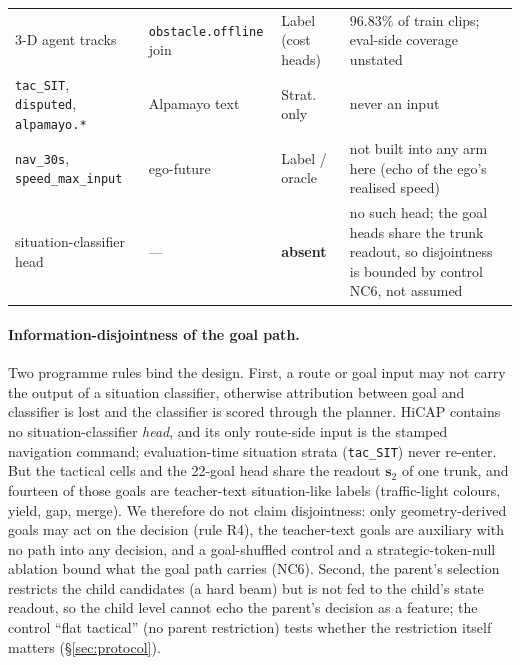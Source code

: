 \begin{table}[t]
\begin{tabular}{@{}p{4.6cm}p{2.5cm}p{2.7cm}p{5.0cm}@{}}
3-D agent tracks & \texttt{obstacle.offline} join & Label (cost heads) & $96.83\%$ of train clips; eval-side coverage unstated \\
\texttt{tac\_SIT}, \texttt{disputed}, \texttt{alpamayo.*} & Alpamayo text & Strat. only & never an input \\
\texttt{nav\_30s}, \texttt{speed\_max\_input} & ego-future & Label / oracle & not built into any arm here (echo of the ego's realised speed) \\
situation-classifier head & --- & \textbf{absent} & no such head; the goal heads share the trunk readout, so disjointness is bounded by control NC6, not assumed \\
\bottomrule
\end{tabular}
\end{table}

\paragraph{Information-disjointness of the goal path.}
Two programme rules bind the design. First, a route or goal input may not carry the output of a situation classifier, otherwise attribution between
goal and classifier is lost and the classifier is scored through the planner. HiCAP contains no situation-classifier \emph{head}, and its only route-side input is the
stamped navigation command; evaluation-time situation strata (\texttt{tac\_SIT}) never re-enter. But the tactical cells and the 22-goal head share the readout $\mathbf s_2$ of one trunk, and fourteen of those goals are teacher-text situation-like labels (traffic-light colours, yield, gap, merge). We therefore do not claim disjointness: only geometry-derived goals may act on the decision (rule R4), the teacher-text goals are auxiliary with no path into any decision, and a goal-shuffled control and a strategic-token-null ablation bound what the goal path carries (NC6).
Second, the parent's selection restricts the child candidates
(a hard beam) but is not fed to the child's state readout, so the child level cannot echo the parent's decision as a feature; the control ``flat tactical'' (no parent restriction) tests whether the restriction itself matters (\S\ref{sec:protocol}).

